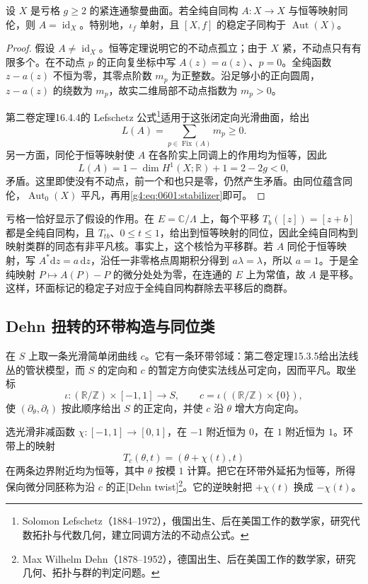 \begin{proposition}\label{g4:prop:0601:automorphism-faithful}
	设 \(X\) 是亏格 \(g\ge2\) 的紧连通黎曼曲面。若全纯自同构 \(A:X\to X\) 与恒等映射同伦，则 \(A=\operatorname{id}_X\)。特别地，\(\iota_f\) 单射，且 \([X,f]\) 的稳定子同构于 \(\operatorname{Aut}(X)\)。
\end{proposition}
\begin{proof}
	假设 \(A\ne\operatorname{id}_X\)。恒等定理说明它的不动点孤立；由于 \(X\) 紧，不动点只有有限多个。在不动点 \(p\) 的正向复坐标中写 \(A(z)=a(z)\)、\(p=0\)。全纯函数 \(z-a(z)\) 不恒为零，其零点阶数 \(m_p\) 为正整数。沿足够小的正向圆周，\(z-a(z)\) 的绕数为 \(m_p\)，故实二维局部不动点指数为 \(m_p>0\)。

	第二卷定理16.4.4的 Lefschetz 公式\footnote{Solomon Lefschetz（1884--1972），俄国出生、后在美国工作的数学家，研究代数拓扑与代数几何，建立同调方法的不动点公式。}适用于这张闭定向光滑曲面，给出
	\[
		L(A)=\sum_{p\in\operatorname{Fix}(A)}m_p\ge0.
	\]
	另一方面，同伦于恒等映射使 \(A\) 在各阶实上同调上的作用均为恒等，因此
	\[
		L(A)=1-\dim H^1(X;\mathbb R)+1=2-2g<0,
	\]
	矛盾。这里即使没有不动点，前一个和也只是零，仍然产生矛盾。由同位蕴含同伦，\(\operatorname{Aut}_0(X)\) 平凡，再用\eqref{g4:eq:0601:stabilizer}即可。
\end{proof}

亏格一恰好显示了假设的作用。在 \(E=\mathbb C/\Lambda\) 上，每个平移 \(T_b([z])=[z+b]\) 都是全纯自同构，且 \(T_{tb}\)、\(0\le t\le1\)，给出到恒等映射的同位，因此全纯自同构到映射类群的同态有非平凡核。事实上，这个核恰为平移群。若 \(A\) 同伦于恒等映射，写 \(A^*\mathrm{d}z=a\,\mathrm{d}z\)，沿任一非零格点周期积分得到 \(a\lambda=\lambda\)，所以 \(a=1\)。于是全纯映射 \(P\mapsto A(P)-P\) 的微分处处为零，在连通的 \(E\) 上为常值，故 \(A\) 是平移。这样，环面标记的稳定子对应于全纯自同构群除去平移后的商群。

\subsection{Dehn 扭转的环带构造与同位类}
\label{g4:subsec:0601:04}

在 \(S\) 上取一条光滑简单闭曲线 \(c\)。它有一条环带邻域：第二卷定理15.3.5给出法线丛的管状模型，而 \(S\) 的定向和 \(c\) 的暂定方向使实法线丛可定向，因而平凡。取坐标
\[
	\iota:(\mathbb R/\mathbb Z)\times[-1,1]\longrightarrow S,
	\qquad c=\iota((\mathbb R/\mathbb Z)\times\{0\}),
\]
使 \((\partial_\theta,\partial_t)\) 按此顺序给出 \(S\) 的正定向，并使 \(c\) 沿 \(\theta\) 增大方向定向。

\begin{definition}\label{g4:def:0601:dehn-twist}
	选光滑非减函数 \(\chi:[-1,1]\to[0,1]\)，在 \(-1\) 附近恒为 \(0\)，在 \(1\) 附近恒为 \(1\)。环带上的映射
	\begin{equation}\label{g4:eq:0601:dehn-annulus}
		T_c(\theta,t)=(\theta+\chi(t),t)
	\end{equation}
	在两条边界附近均为恒等，其中 \(\theta\) 按模 \(1\) 计算。把它在环带外延拓为恒等，所得保向微分同胚称为沿 \(c\) 的正[Dehn twist]\footnote{Max Wilhelm Dehn（1878--1952），德国出生、后在美国工作的数学家，研究几何、拓扑与群的判定问题。}。它的逆映射把 \(+\chi(t)\) 换成 \(-\chi(t)\)。
\end{definition}

